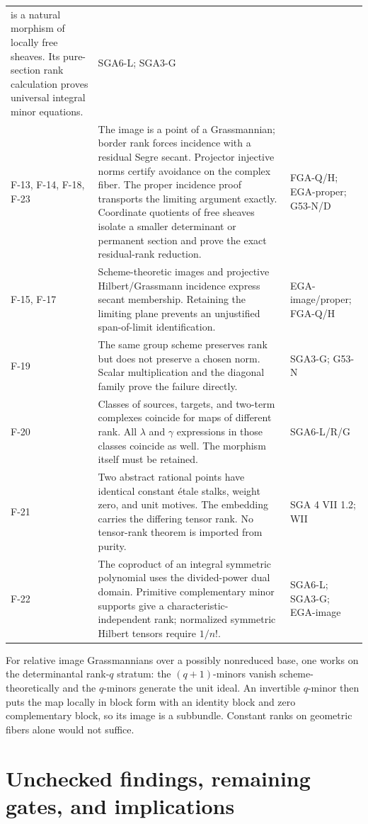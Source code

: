 \documentclass[11pt]{article}
\begin{document}
\begin{longtable}{p{1.8cm}p{9.0cm}p{2.1cm}}
is a natural morphism of locally free sheaves. Its
pure-section rank calculation proves universal integral
minor equations.
& SGA6-L; SGA3-G\\
F-13, F-14, F-18, F-23 & The image is a point of a Grassmannian;
border rank forces incidence with a residual Segre secant.
Projector injective norms certify avoidance on the complex
fiber. The proper incidence proof transports the limiting
argument exactly. Coordinate quotients of free sheaves isolate
a smaller determinant or permanent section and prove the
exact residual-rank reduction.
& FGA-Q/H; EGA-proper; G53-N/D\\
F-15, F-17 & Scheme-theoretic images and projective
Hilbert/Grassmann incidence express secant membership.
Retaining the limiting plane prevents an unjustified
span-of-limit identification.
& EGA-image/proper; FGA-Q/H\\
F-19 & The same group scheme preserves rank but does
not preserve a chosen norm. Scalar multiplication and
the diagonal family prove the failure directly.
& SGA3-G; G53-N\\
F-20 & Classes of sources, targets, and two-term complexes
coincide for maps of different rank. All $\lambda$ and
$\gamma$ expressions in those classes coincide as well.
The morphism itself must be retained.
& SGA6-L/R/G\\
F-21 & Two abstract rational points have identical
constant \'etale stalks, weight zero, and unit motives.
The embedding carries the differing tensor rank.
No tensor-rank theorem is imported from purity.
& SGA 4 VII 1.2; WII\\
F-22 & The coproduct of an integral symmetric polynomial
uses the divided-power dual domain. Primitive complementary
minor supports give a characteristic-independent rank;
normalized symmetric Hilbert tensors require $1/n!$.
& SGA6-L; SGA3-G; EGA-image\\
\bottomrule
\end{longtable}
\endgroup
For relative image Grassmannians over a possibly nonreduced base,
one works on the determinantal rank-$q$ stratum: the
$(q+1)$-minors vanish scheme-theoretically and the $q$-minors
generate the unit ideal. An invertible $q$-minor then puts the
map locally in block form with an identity block and zero
complementary block, so its image is a subbundle.
Constant ranks on geometric fibers alone would not suffice.

\part{Unchecked findings, remaining gates, and implications}
\end{document}
